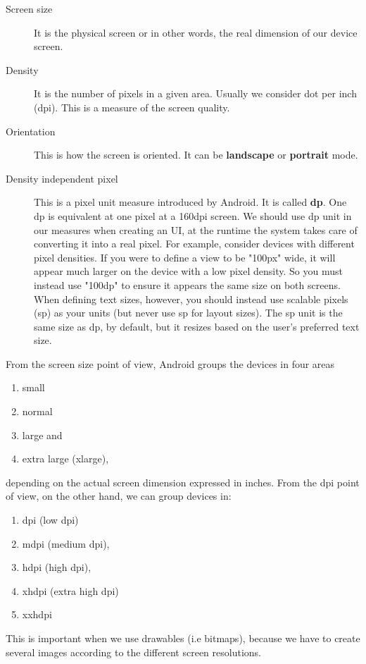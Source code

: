 \begin{description}
	\item[Screen size] It is the physical screen or in other words, the real dimension of our device screen.
	\item[Density] It is the number of pixels in a given area. Usually we consider dot per inch (dpi). This is a measure of the screen
	quality.
	\item[Orientation] This is how the screen is oriented. It can be \textbf{landscape} or \textbf{portrait} mode.
	\item[Density independent pixel] This is a  pixel unit measure introduced by Android. It is called \textbf{dp}. One dp is equivalent at one pixel at a 160dpi screen. We should use dp unit in our measures when creating an UI, at the runtime the system takes care of converting it into a real pixel. For example, consider  devices with different pixel densities. If you were to define a view to be "100px" wide, it will appear much larger on the device with a low pixel density. So you must instead use "100dp" to ensure it appears the same size on both screens.
	When defining text sizes, however, you should instead use scalable pixels (sp) as your units (but never use sp for layout sizes). The sp unit is the same size as dp, by default, but it resizes based on the user's preferred text size.
\end{description}

From the screen size point of view, Android groups the devices in four areas
\begin{enumerate}
	\item small
	\item normal
	\item large and
	 \item extra large (xlarge),
\end{enumerate}


depending on the actual screen dimension expressed in inches. From the dpi point of view, on the other hand, we can group
devices in: 
\begin{enumerate}
	\item dpi (low dpi)
	\item mdpi (medium dpi), 
	\item hdpi (high dpi), 
	\item xhdpi (extra high dpi)
	\item  xxhdpi
\end{enumerate}

This is important when we use drawables (i.e bitmaps), because we have to create several images according to the different screen resolutions.

